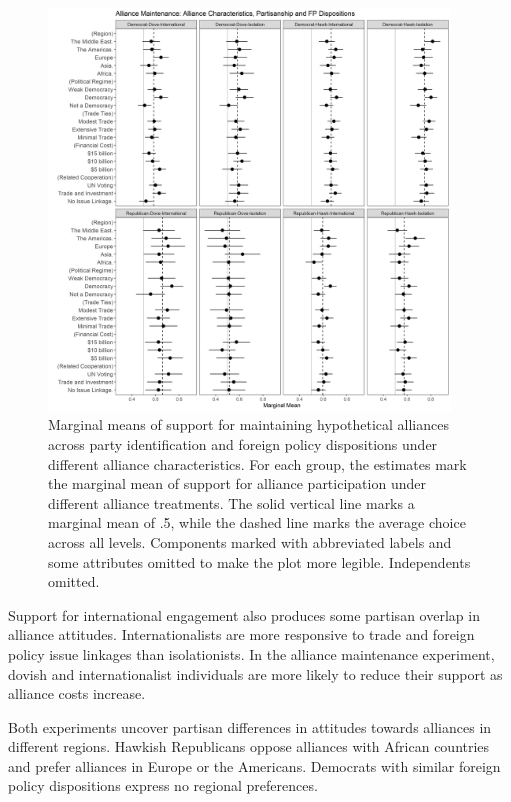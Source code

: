 \documentclass[12pt]{article}
\begin{document}
\begin{figure}
	\centering
		\includegraphics[width=0.95\textwidth]{../figures/party-dispo-main-char.png}
	\caption{Marginal means of support for maintaining hypothetical alliances across party identification and foreign policy dispositions under different alliance characteristics. For each group, the estimates mark the marginal mean of support for alliance participation under different alliance treatments. The solid vertical line marks a marginal mean of .5, while the dashed line marks the average choice across all levels. Components marked with abbreviated labels and some attributes omitted to make the plot more legible. Independents omitted.}
	\label{fig:party-dispo-main-char}
\end{figure}


Support for international engagement also produces some partisan overlap in alliance attitudes. 
Internationalists are more responsive to trade and foreign policy issue linkages than isolationists. 
In the alliance maintenance experiment, dovish and internationalist individuals are more likely to reduce their support as alliance costs increase.


Both experiments uncover partisan differences in attitudes towards alliances in different regions. 
Hawkish Republicans oppose alliances with African countries and prefer alliances in Europe or the Americans. 
Democrats with similar foreign policy dispositions express no regional preferences.  
\end{document}
